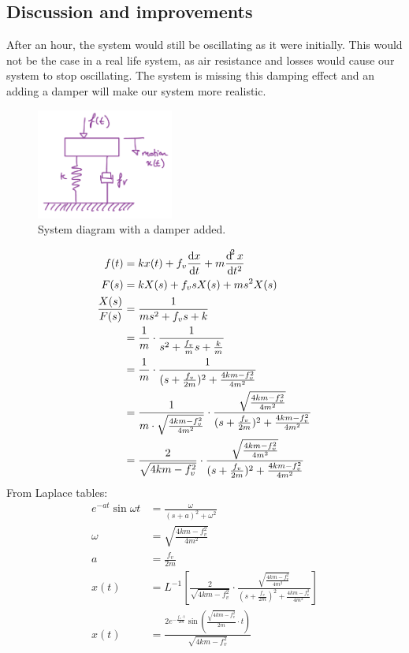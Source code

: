 \documentclass[12pt]{article}
\numberwithin{equation}{section}
\begin{document}
\subsection*{Discussion and improvements}
After an hour, the system would still be oscillating as it were initially. This would not be the case in a real life system, as air resistance and losses would cause our system to stop oscillating. The system is missing this damping effect and an adding a damper will make our system more realistic.
\begin{figure}[H]
  \centering
  \includegraphics[width=0.4\textwidth]{./img/3-3dampedsystem.png}
  \caption{System diagram with a damper added.}
\end{figure}
\begin{align}
  f(t) &= kx(t) + f_v \frac{\dif x}{\dif t} + m \frac{\dif ^2 x}{\dif t^2}\\
  F(s) &= kX(s) + f_v s X(s) + m s^2 X(s)\\
  \frac{X(s)}{F(s)} &= \frac{1}{ms^2 + f_v s + k}\\
  &= \frac{1}{m}\cdot \frac{1}{s^2 + \frac{f_v}{m}s + \frac{k}{m}}\\
  &= \frac{1}{m} \cdot \frac{1}{(s+\frac{f_v}{2m})^2 +\frac{4km - f_v^2}{4m^2}}\\
  &= \frac{1}{m \cdot \sqrt{\frac{4km - f_v^2}{4m^2}}} \cdot \frac{\sqrt{\frac{4km - f_v^2}{4m^2}}}{(s+\frac{f_v}{2m})^2 +\frac{4km - f_v^2}{4m^2}}\\
  &= \frac{2}{\sqrt{4km - f_v^2}} \cdot \frac{\sqrt{\frac{4km - f_v^2}{4m^2}}}{(s+\frac{f_v}{2m})^2 +\frac{4km - f_v^2}{4m^2}}
\end{align}
From Laplace tables: 
\begin{align}
  e^{-at}\sin{\omega t} &= \frac{\omega}{(s + a)^2 + \omega^2}\\
  \omega &= \sqrt{\frac{4km - f_v^2}{4m^2}}\\
  a &= \frac{f_v}{2m}\\
  x(t) &= L^{-1} \left[ \frac{2}{\sqrt{4km - f_v^2}} \cdot \frac{\sqrt{\frac{4km - f_v^2}{4m^2}}}{(s+\frac{f_v}{2m})^2 +\frac{4km - f_v^2}{4m^2}} \right]\\
  x(t) &= \frac{2e^{-\frac{f_v \cdot t}{2m}}\sin{\left(\frac{\sqrt{4km-f_v^2 }}{2m} \cdot t\right)}}{\sqrt{4km - f_v^2}}
\end{align}
\end{document}
